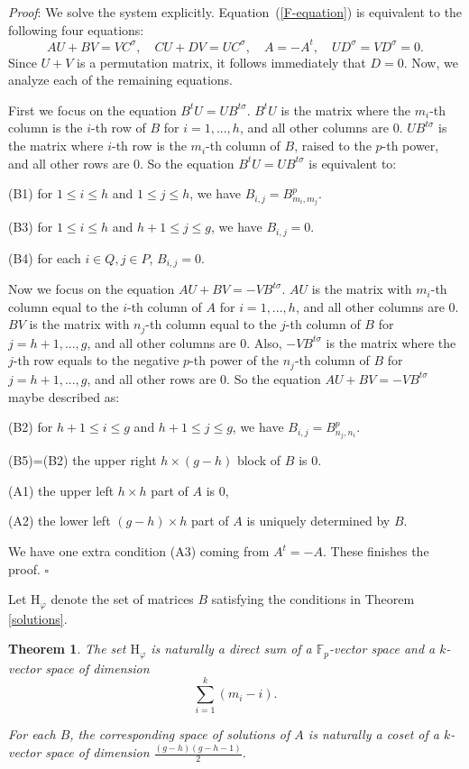 \documentclass[a4paper,12pt,twoside]{report}
\newtheorem{theorem}{Theorem}[section]
\newcommand{\F}{\mathbb{F}}
\begin{document}
\noindent\emph{Proof}: 
We solve the system explicitly. Equation~(\ref{F-equation}) is equivalent to the following four equations: 
\[AU+BV=V C^{\sigma}, \quad CU+DV=U C^{\sigma}, \quad A=-A^t, \quad UD^\sigma=VD^\sigma=0.\]
Since $U+V$ is a permutation matrix,  it follows immediately that $D=0$. 
Now, we analyze each of the remaining equations.

First we focus on the equation $B^tU=UB^{t\sigma}$. 
$B^tU$ is the matrix where the $m_i$-th column is the $i$-th row of $B$ for $i=1,...,h$, 
and all other columns are $0$. 
$UB^{t\sigma}$ is the matrix where $i$-th row is the $m_i$-th column of $B$, 
raised to the $p$-th power, and all other rows are $0$. 
So the equation $B^tU=UB^{t\sigma}$ is equivalent to: 

(B1) for $1\leqslant i\leqslant h$ and $1\leqslant j\leqslant h$, we have $B_{i,j}=B_{m_i,m_j}^p$. 

(B3) for $1\leqslant i\leqslant h$ and $h+1\leqslant j \leqslant g$, we have $B_{i,j}=0$. 

(B4) for each $i\in Q,j \in P$, $B_{i,j}=0$. 

Now we focus on the equation $AU+BV=-VB^{t\sigma}$. 
$AU$ is the matrix with $m_i$-th column equal to the $i$-th column of $A$ for $i=1,...,h$, and all other columns are $0$. 
$BV$ is the matrix with $n_j$-th column equal to the $j$-th column of $B$ for $j=h+1,...,g$, and all other columns are $0$. 
Also, $-VB^{t\sigma}$ is the matrix where the $j$-th row equals to the negative $p$-th power of the $n_j$-th column of $B$ for $j=h+1,...,g$, 
and all other rows are $0$. 
So the equation $AU+BV=-VB^{t\sigma}$ maybe described as: 

(B2) for $h+1\leqslant i\leqslant g$ and $h+1\leqslant j\leqslant g$, we have $B_{i,j}=B_{n_j,n_i}^p$.

(B5)=(B2) the upper right $h\times (g-h)$ block of $B$ is $0$. 

(A1) the upper left $h\times h$ part of $A$ is $0$, 

(A2) the lower left $(g-h)\times h$ part of $A$ is uniquely determined by $B$. 

We have one extra condition (A3) coming from $A^t=-A$. These finishes the proof. $\square$

Let $\mathrm{H}_{\varphi}$ denote the set of matrices $B$ satisfying the conditions in Theorem \ref{solutions}. 

\begin{theorem}\label{dimH}
    The set $\mathrm{H}_{\varphi}$ is naturally 
    a direct sum of a $\F_p$-vector space and a $k$-vector space of dimension 
    \[\sum_{i=1}^k(m_i-i).\] 

    For each $B$, the corresponding space of solutions of $A$ 
    is naturally a coset of a $k$-vector space of dimension $\frac{(g-h)(g-h-1)}{2}$. 
\end{theorem}
\end{document}
